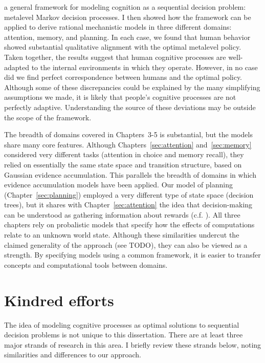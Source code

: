\label{conclusion}

 a general framework for modeling cognition as a sequential decision problem: metalevel Markov decision processes. I then showed how the framework can be applied to derive rational mechanistic models in three different domains: attention, memory, and planning. In each case, we found that human behavior showed substantial qualitative alignment with the optimal metalevel policy. Taken together, the results suggest that human cognitive processes are well-adapted to the internal environments in which they operate. However, in no case did we find perfect correspondence between humans and the optimal policy. Although some of these discrepancies could be explained by the many simplifying assumptions we made, it is likely that people's cognitive processes are not perfectly adaptive. Understanding the source of these deviations may be outside the scope of the framework.

The breadth of domains covered in Chapters~3-5 is substantial, but the models share many core features. Although Chapters~\ref{sec:attention} and~\ref{sec:memory} considered very different tasks (attention in choice and memory recall), they relied on essentially the same state space and transition structure, based on Gaussian evidence accumulation. This parallels the breadth of domains in which evidence accumulation models have been applied. Our model of planning (Chapter~\ref{sec:planning}) employed a very different type of state space (decision trees), but it shares with Chapter~\ref{sec:attention} the idea that decision-making can be understood as gathering information about rewards (c.f. \citealp{tajima2016optimal,sezener2019optimizing}). All three chapters rely on probalistic models that specify how the effects of computations relate to an unknown world state. Although these similarities undercut the claimed generality of the approach (see TODO), they can also be viewed as a strength. By specifying models using a common framework, it is easier to transfer concepts and computational tools between domains.

\section{Kindred efforts}\label{sec:kindred}

The idea of modeling cognitive processes as optimal solutions to sequential decision problems is not unique to this dissertation. There are at least three major strands of research in this area. I briefly review these strands below, noting similarities and differences to our approach.

